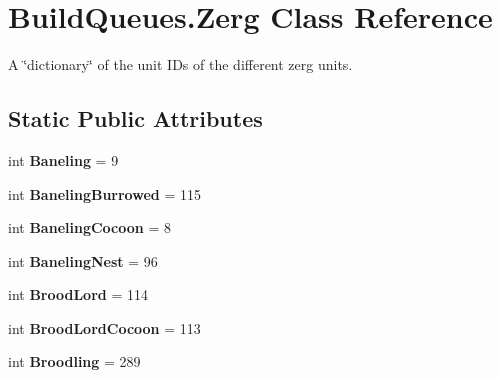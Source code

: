 \hypertarget{classBuildQueues_1_1Zerg}{}\section{Build\+Queues.\+Zerg Class Reference}
\label{classBuildQueues_1_1Zerg}


A \char`\"{}dictionary\char`\"{} of the unit ID\textquotesingle{}s of the different zerg units.  


\subsection*{Static Public Attributes}
\begin{DoxyCompactItemize}
\item 
int {\bfseries Baneling} = 9\hypertarget{classBuildQueues_1_1Zerg_a50a80534ca3dd097ba6d4b81437dde9a}{}\label{classBuildQueues_1_1Zerg_a50a80534ca3dd097ba6d4b81437dde9a}

\item 
int {\bfseries Baneling\+Burrowed} = 115\hypertarget{classBuildQueues_1_1Zerg_a2d4dfd042a8144ffc6fa9e783f636619}{}\label{classBuildQueues_1_1Zerg_a2d4dfd042a8144ffc6fa9e783f636619}

\item 
int {\bfseries Baneling\+Cocoon} = 8\hypertarget{classBuildQueues_1_1Zerg_a73737c2c372b27db93425511d1defc2f}{}\label{classBuildQueues_1_1Zerg_a73737c2c372b27db93425511d1defc2f}

\item 
int {\bfseries Baneling\+Nest} = 96\hypertarget{classBuildQueues_1_1Zerg_af64a3e988ac23224b101ae3f8044cbd1}{}\label{classBuildQueues_1_1Zerg_af64a3e988ac23224b101ae3f8044cbd1}

\item 
int {\bfseries Brood\+Lord} = 114\hypertarget{classBuildQueues_1_1Zerg_aee0c7e803911ef7b40f941b1d4806b62}{}\label{classBuildQueues_1_1Zerg_aee0c7e803911ef7b40f941b1d4806b62}

\item 
int {\bfseries Brood\+Lord\+Cocoon} = 113\hypertarget{classBuildQueues_1_1Zerg_ae0b2863527f9b8bfbb8e8834b17e9c7b}{}\label{classBuildQueues_1_1Zerg_ae0b2863527f9b8bfbb8e8834b17e9c7b}

\item 
int {\bfseries Broodling} = 289\hypertarget{classBuildQueues_1_1Zerg_a6ac60cbbede7c799824b979f703357c5}{}\label{classBuildQueues_1_1Zerg_a6ac60cbbede7c799824b979f703357c5}


\end{DoxyCompactItemize}
